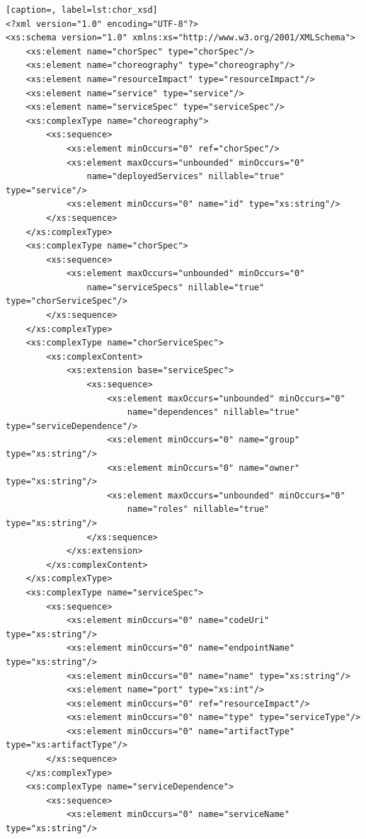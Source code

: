 \documentclass[a4paper, 10pt]{article}
\begin{document}
{\footnotesize

\lstset{language=XML}

\begin{lstlisting}[caption=, label=lst:chor_xsd]
<?xml version="1.0" encoding="UTF-8"?>
<xs:schema version="1.0" xmlns:xs="http://www.w3.org/2001/XMLSchema">
    <xs:element name="chorSpec" type="chorSpec"/>
    <xs:element name="choreography" type="choreography"/>
    <xs:element name="resourceImpact" type="resourceImpact"/>
    <xs:element name="service" type="service"/>
    <xs:element name="serviceSpec" type="serviceSpec"/>
    <xs:complexType name="choreography">
        <xs:sequence>
            <xs:element minOccurs="0" ref="chorSpec"/>
            <xs:element maxOccurs="unbounded" minOccurs="0"
                name="deployedServices" nillable="true" type="service"/>
            <xs:element minOccurs="0" name="id" type="xs:string"/>
        </xs:sequence>
    </xs:complexType>
    <xs:complexType name="chorSpec">
        <xs:sequence>
            <xs:element maxOccurs="unbounded" minOccurs="0"
                name="serviceSpecs" nillable="true" type="chorServiceSpec"/>
        </xs:sequence>
    </xs:complexType>
    <xs:complexType name="chorServiceSpec">
        <xs:complexContent>
            <xs:extension base="serviceSpec">
                <xs:sequence>
                    <xs:element maxOccurs="unbounded" minOccurs="0"
                        name="dependences" nillable="true" type="serviceDependence"/>
                    <xs:element minOccurs="0" name="group" type="xs:string"/>
                    <xs:element minOccurs="0" name="owner" type="xs:string"/>
                    <xs:element maxOccurs="unbounded" minOccurs="0"
                        name="roles" nillable="true" type="xs:string"/>
                </xs:sequence>
            </xs:extension>
        </xs:complexContent>
    </xs:complexType>
    <xs:complexType name="serviceSpec">
        <xs:sequence>
            <xs:element minOccurs="0" name="codeUri" type="xs:string"/>
            <xs:element minOccurs="0" name="endpointName" type="xs:string"/>
            <xs:element minOccurs="0" name="name" type="xs:string"/>
            <xs:element name="port" type="xs:int"/>
            <xs:element minOccurs="0" ref="resourceImpact"/>
            <xs:element minOccurs="0" name="type" type="serviceType"/>
            <xs:element minOccurs="0" name="artifactType" type="xs:artifactType"/>
        </xs:sequence>
    </xs:complexType>
    <xs:complexType name="serviceDependence">
        <xs:sequence>
            <xs:element minOccurs="0" name="serviceName" type="xs:string"/>

\end{lstlisting}}
\end{document}
